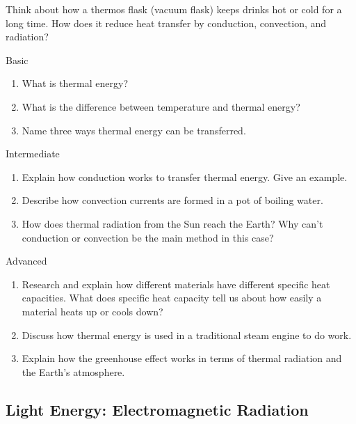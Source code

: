 \begin{stopandthink}
Think about how a thermos flask (vacuum flask) keeps drinks hot or cold for a long time. How does it reduce heat transfer by conduction, convection, and radiation?
\end{stopandthink}


\begin{tieredquestions}{Basic}
\begin{enumerate}
    \item What is thermal energy?
    \item What is the difference between temperature and thermal energy?
    \item Name three ways thermal energy can be transferred.
\end{enumerate}
\end{tieredquestions}

\begin{tieredquestions}{Intermediate}
\begin{enumerate}
    \item Explain how conduction works to transfer thermal energy. Give an example.
    \item Describe how convection currents are formed in a pot of boiling water.
    \item How does thermal radiation from the Sun reach the Earth? Why can't conduction or convection be the main method in this case?
\end{enumerate}
\end{tieredquestions}

\begin{tieredquestions}{Advanced}
\begin{enumerate}
    \item Research and explain how different materials have different specific heat capacities. What does specific heat capacity tell us about how easily a material heats up or cools down?
    \item Discuss how thermal energy is used in a traditional steam engine to do work.
    \item  Explain how the greenhouse effect works in terms of thermal radiation and the Earth's atmosphere.
\end{enumerate}
\end{tieredquestions}


\subsection{Light Energy: Electromagnetic Radiation}

